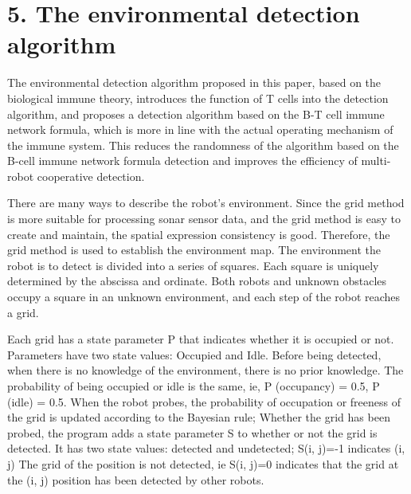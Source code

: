\documentclass[Proceedings]{ascelike}
\begin{document}
\section{5. The environmental detection algorithm}
The environmental detection algorithm proposed in this paper, based on the biological immune theory, introduces the function of T cells into the detection algorithm, and proposes a detection algorithm based on the B-T cell immune network formula, which is more in line with the actual operating mechanism of the immune system. This reduces the randomness of the algorithm based on the B-cell immune network formula detection and improves the efficiency of multi-robot cooperative detection.
\par
There are many ways to describe the robot's environment. Since the grid method is more suitable for processing sonar sensor data, and the grid method is easy to create and maintain, the spatial expression consistency is good. Therefore, the grid method is used to establish the environment map. The environment the robot is to detect is divided into a series of squares. Each square is uniquely determined by the abscissa and ordinate. Both robots and unknown obstacles occupy a square in an unknown environment, and each step of the robot reaches a grid.
\par
Each grid has a state parameter P that indicates whether it is occupied or not. Parameters have two state values: Occupied and Idle. Before being detected, when there is no knowledge of the environment, there is no prior knowledge. The probability of being occupied or idle is the same, ie, P (occupancy) = 0.5, P (idle) = 0.5. When the robot probes, the probability of occupation or freeness of the grid is updated according to the Bayesian rule; Whether the grid has been probed, the program adds a state parameter S to whether or not the grid is detected. It has two state values: detected and undetected; S(i, j)=-1 indicates (i, j) The grid of the position is not detected, ie S(i, j)=0 indicates that the grid at the (i, j) position has been detected by other robots.
\end{document}
